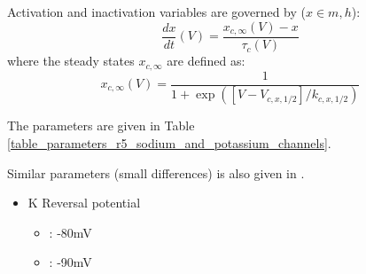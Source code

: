 \documentclass[../../workflow.tex]{subfiles}
\begin{document}
Activation and inactivation variables are governed by ($x \in {m,h}$):
\begin{equation*}
    \frac{dx}{dt}(V) = \frac{x_{c,\infty}(V) - x}{\tau_{c}(V)}
\end{equation*}
where the steady states $x_{c,\infty}$ are defined as:
\begin{equation*}
    x_{c,\infty}(V) = \frac{1}{1 + \exp{([V - V_{c,x,1/2}]/k_{c,x,1/2})}}
\end{equation*}

The parameters are given in Table \ref{table_parameters_r5_sodium_and_potassium_channels}.

\begin{table}[h!]
    \centering
    \caption{Channel parameters for activation and inactivation of sodium and potassium channels.}
    \label{table_parameters_r5_sodium_and_potassium_channels}
\end{table}

\begin{note}
    Similar parameters (small differences) is also given in \parencite{linActivityDependentAlternativeSplicing2012}.
\end{note}

\begin{itemize}
    \item K Reversal potential
    \begin{itemize}
        \item \parencite{gunayDistalSpikeInitiation2015}: -80mV
        \item \parencite{qiuCollectiveDynamicsNeural2021}: -90mV
    \end{itemize}
\end{itemize}
\end{document}
